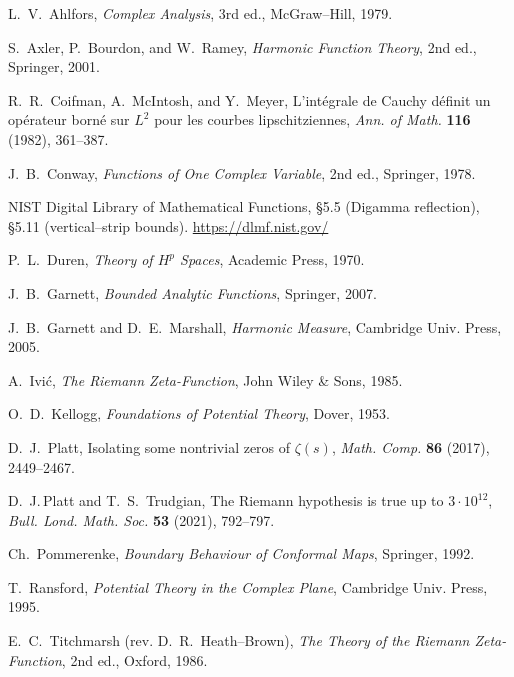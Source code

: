 \documentclass[11pt]{article}
\numberwithin{equation}{section}
\theoremstyle{remark}
\begin{document}
\begin{thebibliography}{99}

L.~V.~Ahlfors, \emph{Complex Analysis}, 3rd ed., McGraw--Hill, 1979.

S.~Axler, P.~Bourdon, and W.~Ramey, \emph{Harmonic Function Theory}, 2nd ed., Springer, 2001.

R.~R.~Coifman, A.~McIntosh, and Y.~Meyer,
L’int\'egrale de Cauchy d\'efinit un op\'erateur born\'e sur $L^2$ pour les courbes lipschitziennes,
\emph{Ann. of Math.} \textbf{116} (1982), 361--387.

J.~B.~Conway, \emph{Functions of One Complex Variable}, 2nd ed., Springer, 1978.

NIST Digital Library of Mathematical Functions, \S5.5 (Digamma reflection), \S5.11 (vertical--strip bounds).
\url{https://dlmf.nist.gov/}

P.~L.~Duren, \emph{Theory of $H^p$ Spaces}, Academic Press, 1970.

J.~B.~Garnett, \emph{Bounded Analytic Functions}, Springer, 2007.

J.~B.~Garnett and D.~E.~Marshall, \emph{Harmonic Measure}, Cambridge Univ. Press, 2005.

A.~Ivi\'c, \emph{The Riemann Zeta-Function}, John Wiley \& Sons, 1985.

O.~D.~Kellogg, \emph{Foundations of Potential Theory}, Dover, 1953.

D.~J.~Platt, Isolating some nontrivial zeros of $\zeta(s)$, \emph{Math. Comp.} \textbf{86} (2017), 2449–2467.

D.~J.\,Platt and T.~S.~Trudgian, The Riemann hypothesis is true up to $3\cdot 10^{12}$,
\emph{Bull. Lond. Math. Soc.} \textbf{53} (2021), 792–797.

Ch.~Pommerenke, \emph{Boundary Behaviour of Conformal Maps}, Springer, 1992.

T.~Ransford, \emph{Potential Theory in the Complex Plane}, Cambridge Univ. Press, 1995.

E.~C.~Titchmarsh (rev. D.~R.~Heath--Brown), \emph{The Theory of the Riemann Zeta-Function}, 2nd ed., Oxford, 1986.

\end{thebibliography}
\end{document}
